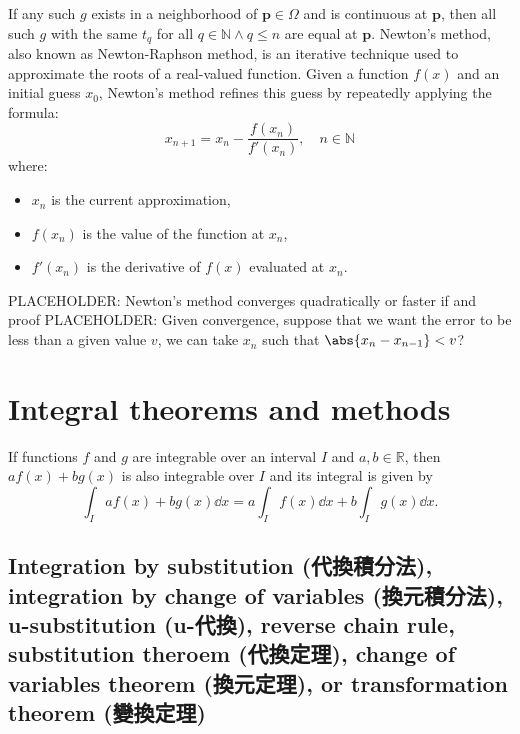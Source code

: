 \documentclass[a4paper,12pt]{report}
\begin{document}
\begin{itemize}
\begin{itemize}
If any such $g$ exists in a neighborhood of $\mathbf{p}\in\Omega$ and is continuous at $\mathbf{p}$, then all such $g$ with the same $t_q$ for all $q\in\mathbb{N}\land q\leq n$ are equal at $\mathbf{p}$.
Newton's method, also known as Newton-Raphson method, is an iterative technique used to approximate the roots of a real-valued function. Given a function $f(x)$ and an initial guess \( x_0 \), Newton's method refines this guess by repeatedly applying the formula:
\[
x_{n+1} = x_n - \frac{f(x_n)}{f'(x_n)},\quad n\in\mathbb{N}
\]
where:
\begin{itemize}
\item \( x_n \) is the current approximation,
\item \( f(x_n) \) is the value of the function at \( x_n \),
\item \( f'(x_n) \) is the derivative of \( f(x) \) evaluated at \( x_n \).
\end{itemize}
PLACEHOLDER: Newton's method converges quadratically or faster if and proof
PLACEHOLDER: Given convergence, suppose that we want the error to be less than a given value $v$, we can take $x_n$ such that $\abs{x_n-x_{n-1}}<v$?



\section{Integral theorems and methods}
If functions $f$ and $g$ are integrable over an interval $I$ and $a,b\in\mathbb{R}$, then $af(x)+bg(x)$ is also integrable over $I$ and its integral is given by
\[\int_Iaf(x)+bg(x)\dd{x}=a\int_If(x)\dd{x}+b\int_Ig(x)\dd{x}.\]
\subsection{Integration by substitution (代換積分法), integration by change of variables (換元積分法), u-substitution (u-代換), reverse chain rule, substitution theroem (代換定理), change of variables theorem (換元定理), or transformation theorem (變換定理)}

\end{itemize}
\end{itemize}
\end{document}
